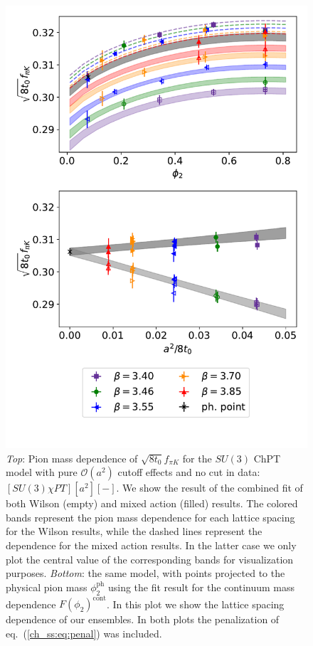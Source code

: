 \begin{figure}
    \centering
    \includegraphics[width=1.\textwidth, angle=0]{./cap5/figs/SU3_comb.pdf}
    \caption{\textit{Top}: Pion mass dependence of $\sqrt{8t_0}f_{\pi K}$ for the $SU(3)$ ChPT model with pure $\mathcal{O}(a^2)$ cutoff effects and no cut in data: $[SU(3)\chi PT][a^2][-]$. We show the result of the combined fit of both Wilson (empty) and mixed action (filled) results. The colored bands represent the pion mass dependence for each lattice spacing for the Wilson results, while the dashed lines represent the dependence for the mixed action results. In the latter case we only plot the central value of the corresponding bands for visualization purposes. \textit{Bottom}: the same model, with points projected to the physical pion mass $\phi_2^{\textrm{ph}}$ using the fit result for the continuum mass dependence $F(\phi_2)^{\textrm{cont}}$. In this plot we show the lattice spacing dependence of our ensembles. In both plots the penalization of eq.~(\ref{ch_ss:eq:penal}) was included.}
    \label{ch_ss:fig:SU3a2}
\end{figure}

